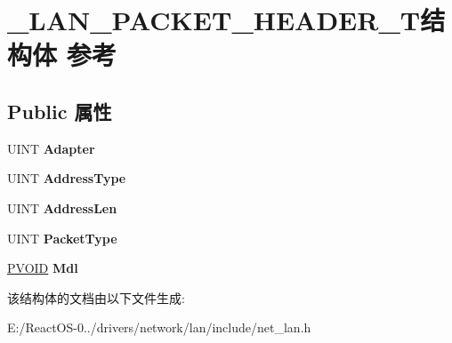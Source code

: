 \hypertarget{struct___l_a_n___p_a_c_k_e_t___h_e_a_d_e_r___t}{}\section{\+\_\+\+L\+A\+N\+\_\+\+P\+A\+C\+K\+E\+T\+\_\+\+H\+E\+A\+D\+E\+R\+\_\+\+T结构体 参考}
\label{struct___l_a_n___p_a_c_k_e_t___h_e_a_d_e_r___t}
\subsection*{Public 属性}
\begin{DoxyCompactItemize}
\item 
\mbox{\label{struct___l_a_n___p_a_c_k_e_t___h_e_a_d_e_r___t_abadc1ef043766b9f2b0067d9c8976e40}} 
U\+I\+NT {\bfseries Adapter}
\item 
\mbox{\label{struct___l_a_n___p_a_c_k_e_t___h_e_a_d_e_r___t_a220cee448377176accf52b2e23879878}} 
U\+I\+NT {\bfseries Address\+Type}
\item 
\mbox{\label{struct___l_a_n___p_a_c_k_e_t___h_e_a_d_e_r___t_a7fdaf0801184349085ce9f4ac331828b}} 
U\+I\+NT {\bfseries Address\+Len}
\item 
\mbox{\label{struct___l_a_n___p_a_c_k_e_t___h_e_a_d_e_r___t_aa5e6102e52e37830f0d82ffaae0ee6f2}} 
U\+I\+NT {\bfseries Packet\+Type}
\item 
\mbox{\label{struct___l_a_n___p_a_c_k_e_t___h_e_a_d_e_r___t_a08b38f5588b82cecec80bcf86eff4c43}} 
\hyperlink{interfacevoid}{P\+V\+O\+ID} {\bfseries Mdl}
\end{DoxyCompactItemize}


该结构体的文档由以下文件生成\+:\begin{DoxyCompactItemize}
\item 
E\+:/\+React\+O\+S-\/0../drivers/network/lan/include/net\+\_\+lan.\+h\end{DoxyCompactItemize}
